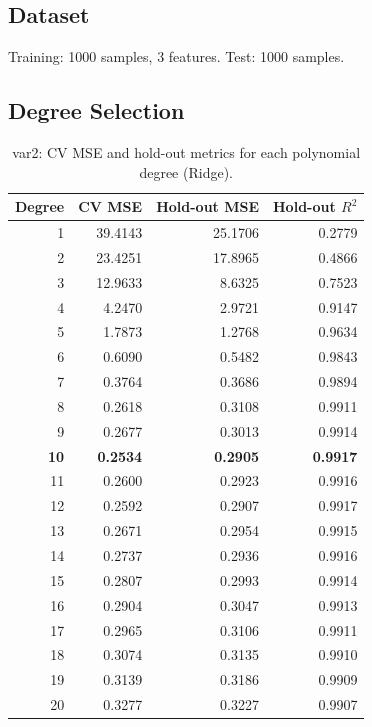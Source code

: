 \documentclass[11pt,a4paper]{article}
\begin{document}
\subsection{Dataset}
Training: 1000 samples, 3 features. Test: 1000 samples.

\subsection{Degree Selection}

\begin{table}[H]
  \centering
  \caption{var2: CV MSE and hold-out metrics for each polynomial degree (Ridge).}
  \label{tab:var2}
  \begin{tabular}{rrrr}
    \toprule
    \textbf{Degree} & \textbf{CV MSE} & \textbf{Hold-out MSE} & \textbf{Hold-out $R^2$} \\
    \midrule
    1  & 39.4143 & 25.1706 & 0.2779 \\
    2  & 23.4251 & 17.8965 & 0.4866 \\
    3  & 12.9633 &  8.6325 & 0.7523 \\
    4  &  4.2470 &  2.9721 & 0.9147 \\
    5  &  1.7873 &  1.2768 & 0.9634 \\
    6  &  0.6090 &  0.5482 & 0.9843 \\
    7  &  0.3764 &  0.3686 & 0.9894 \\
    8  &  0.2618 &  0.3108 & 0.9911 \\
    9  &  0.2677 &  0.3013 & 0.9914 \\
    \textbf{10} & \textbf{0.2534} & \textbf{0.2905} & \textbf{0.9917} \\
    11 &  0.2600 &  0.2923 & 0.9916 \\
    12 &  0.2592 &  0.2907 & 0.9917 \\
    13 &  0.2671 &  0.2954 & 0.9915 \\
    14 &  0.2737 &  0.2936 & 0.9916 \\
    15 &  0.2807 &  0.2993 & 0.9914 \\
    16 &  0.2904 &  0.3047 & 0.9913 \\
    17 &  0.2965 &  0.3106 & 0.9911 \\
    18 &  0.3074 &  0.3135 & 0.9910 \\
    19 &  0.3139 &  0.3186 & 0.9909 \\
    20 &  0.3277 &  0.3227 & 0.9907 \\
    \bottomrule
  \end{tabular}
\end{table}
\end{document}
